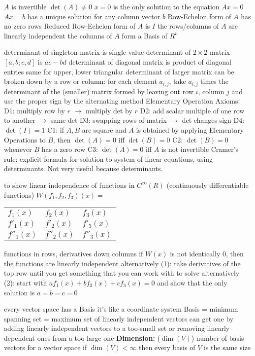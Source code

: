 \documentclass[12pt]{article}
\begin{document}
\begin{multicols*}{2}
\begin{flushleft}
\begin{outline}[longenum]
  \1 $A$ is invertible
  \1 $\det(A) \not= 0$
  \1 $x=0$ is the only solution to the equation $Ax=0$
  \1 $Ax=b$ has a unique solution for any column vector $b$
  \1 Row-Echelon form of $A$ has no zero rows
  \1 Reduced Row-Echelon form of $A$ is $I$
  \1 the rows/columns of $A$ are linearly independent
  \1 the columns of $A$ form a Basis of $R^n$


  \1 determinant of singleton matrix is single value
  \1 determinant of $2\times 2$ matrix $[a,b;c,d]$ is $ac-bd$
  \1 determinant of diagonal matrix is product of diagonal entries
    \2 same for upper, lower triangular
  \1 determinant of larger matrix can be broken down by a row or column:
    \2 for each element $a_{i,j}$, take $a_{i,j}$ times the determinant of  the (smaller) matrix formed by leaving out row $i$, column $j$
    \2 and use the proper sign by the alternating method
  \1 Elementary Operation Axioms:
    \2 D1: multiply row by $r$ $\rightarrow$ multiply det by $r$
    \2 D2: add scalar multiple of one row to another $\rightarrow$ same det
    \2 D3: swapping rows of matrix $\rightarrow$ det changes sign
    \2 D4: $\det(I) = 1$
    \2 C1: if $A,B$ are square and $A$ is obtained by applying Elementary Operations to $B$, then $\det(A)=0$ iff $\det(B)=0$
    \2 C2: $\det(B)=0$ whenever $B$ has a zero row
    \2 C3: $\det(A)=0$ iff $A$ is not invertible
  \1 Cramer's rule: explicit formula for solution to system of linear equations, using determinants. Not very useful because determinants.

  \1 to show linear independence of functions in $C^{\infty}(R)$ (continuously differentiable functions)
  \1 $W(f_1,f_2,f_3)(x) = $
    \begin{tabular}{|l l l|}
      $f_1(x)$ & $f_2(x)$ & $f_3(x)$ \\
      $f'_1(x)$ & $f'_2(x)$ & $f'_3(x)$ \\
      $f''_1(x)$ & $f''_2(x)$ & $f''_3(x)$ \\
    \end{tabular}
      \2 functions in rows, derivatives down columns
  \1 if $W(x)$ is not identically $0$, then the functions are linearly independent
  \1 alternatively (1): take derivatives of the top row until you get something that you can work with to solve
  \1 alternatively (2): start with $af_1(x)+bf_2(x)+cf_3(x)=0$ and show that the only solution is $a=b=c=0$


  \1 every vector space has a Basis
  \1 it's like a coordinate system
  \1 Basis = minimum spanning set = maximum set of linearly independent vectors
  \1 can get one by adding linearly independent vectors to a too-small set or removing linearly dependent ones from a too-large one
  \1 \textbf{Dimension:} ($\dim(V)$) number of basis vectors for a vector space
    \2 if $\dim(V)<\infty$ then every basis of $V$ is the same size


\end{outline}
\end{flushleft}
\end{multicols*}
\end{document}
